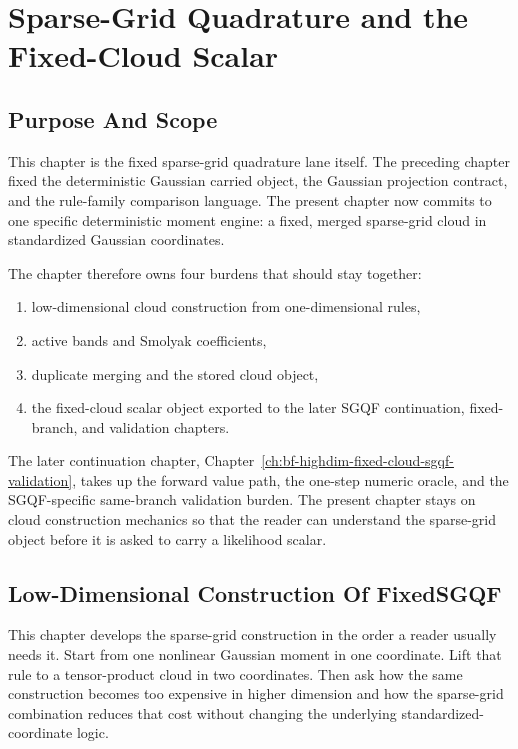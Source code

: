 \chapter[Gaussian And High-Order Filters]{Sparse-Grid Quadrature and the Fixed-Cloud Scalar}
\label{ch:bf-highdim-sparse-grid-fixed-cloud}
\label{ch:bf-highdim-gaussian-quadrature}
\providecommand{\widehatell}{\widehat{\ell}}
\providecommand{\dotwidehatell}{\dot{\widehat{\ell}}}
\providecommand{\dd}{\,\mathrm d}

\section{Purpose And Scope}
\label{sec:bf-hd-sgqf-purpose}

This chapter is the fixed sparse-grid quadrature lane itself.  The preceding
chapter fixed the deterministic Gaussian carried object, the Gaussian
projection contract, and the rule-family comparison language.  The present
chapter now commits to one specific deterministic moment engine: a fixed,
merged sparse-grid cloud in standardized Gaussian coordinates.

The chapter therefore owns four burdens that should stay together:
\begin{enumerate}[leftmargin=0.28in]
  \item low-dimensional cloud construction from one-dimensional rules,
  \item active bands and Smolyak coefficients,
  \item duplicate merging and the stored cloud object,
  \item the fixed-cloud scalar object exported to the later SGQF continuation,
  fixed-branch, and validation chapters.
\end{enumerate}
The later continuation chapter,
Chapter~\ref{ch:bf-highdim-fixed-cloud-sgqf-validation}, takes up the forward
value path, the one-step numeric oracle, and the SGQF-specific same-branch
validation burden.  The present chapter stays on cloud construction mechanics so
that the reader can understand the sparse-grid object before it is asked to carry
a likelihood scalar.

\section{Low-Dimensional Construction Of FixedSGQF}
\label{sec:p34-motivating-cases}

This chapter develops the sparse-grid construction in the order a reader usually
needs it.  Start from one nonlinear Gaussian moment in one coordinate.  Lift that
rule to a tensor-product cloud in two coordinates.  Then ask how the same
construction becomes too expensive in higher dimension and how the sparse-grid
combination reduces that cost without changing the underlying standardized-coordinate
logic.

